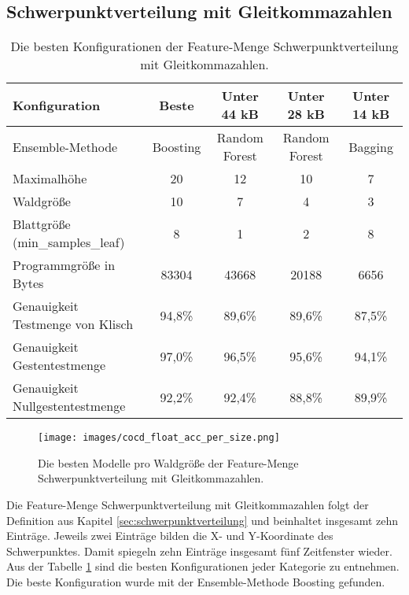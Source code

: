 \subsection{Schwerpunktverteilung mit Gleitkommazahlen}
\begin{table}[h!]
    \hspace{-0.75cm}
    \begin{tabular}{ | l | c | c | c | c |}
        \hline
        Konfiguration & Beste & Unter 44 kB & Unter 28 kB & Unter 14 kB \\\hline
        Ensemble-Methode & Boosting & Random Forest & Random Forest & Bagging  \\\hline
        Maximalhöhe & 20 & 12 & 10 & 7 \\\hline
        Waldgröße & 10 & 7 & 4 & 3 \\\hline
        Blattgröße (min\_samples\_leaf) & 8 & 1 & 2 & 8 \\\hline
        Programmgröße in Bytes & 83304 & 43668 & 20188 & 6656 \\\hline
        Genauigkeit Testmenge von Klisch & 94,8\% & 89,6\% & 89,6\% & 87,5\% \\\hline
        Genauigkeit Gestentestmenge & 97,0\% & 96,5\% & 95,6\% & 94,1\% \\\hline
        Genauigkeit Nullgestentestmenge & 92,2\% & 92,4\% & 88,8\% & 89,9\% \\\hline
    \end{tabular}
    \caption{Die besten Konfigurationen der Feature-Menge Schwerpunktverteilung mit Gleitkommazahlen.}
    \label{tab:schwerpunktverteilung_float}
\end{table}
\begin{figure}[h!]
    \centering
    \texttt{[image: images/cocd\_float\_acc\_per\_size.png]}
    \caption{Die besten Modelle pro Waldgröße der Feature-Menge Schwerpunktverteilung mit Gleitkommazahlen.}
    \label{fig:cocd_float_per_forest_size}
\end{figure}
Die Feature-Menge Schwerpunktverteilung mit Gleitkommazahlen folgt der Definition aus Kapitel \ref{sec:schwerpunktverteilung} und beinhaltet insgesamt zehn Einträge. Jeweils zwei Einträge bilden die X- und
Y-Koordinate des Schwerpunktes. Damit spiegeln zehn Einträge insgesamt fünf Zeitfenster wieder.
\newline
\newline
Aus der Tabelle \ref{tab:schwerpunktverteilung_float} sind die besten Konfigurationen jeder Kategorie zu entnehmen. Die beste Konfiguration wurde mit der Ensemble-Methode Boosting gefunden.
